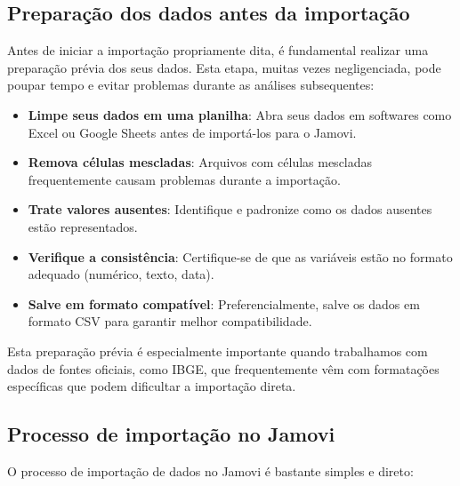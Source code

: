 \subsection{Preparação dos dados antes da importação}

Antes de iniciar a importação propriamente dita, é fundamental realizar uma preparação prévia dos seus dados. Esta etapa, muitas vezes negligenciada, pode poupar tempo e evitar problemas durante as análises subsequentes:

\begin{itemize}
    \item \textbf{Limpe seus dados em uma planilha}: Abra seus dados em softwares como Excel ou Google Sheets antes de importá-los para o Jamovi.
    \item \textbf{Remova células mescladas}: Arquivos com células mescladas frequentemente causam problemas durante a importação.
    \item \textbf{Trate valores ausentes}: Identifique e padronize como os dados ausentes estão representados.
    \item \textbf{Verifique a consistência}: Certifique-se de que as variáveis estão no formato adequado (numérico, texto, data).
    \item \textbf{Salve em formato compatível}: Preferencialmente, salve os dados em formato CSV para garantir melhor compatibilidade.
\end{itemize}

Esta preparação prévia é especialmente importante quando trabalhamos com dados de fontes oficiais, como IBGE, que frequentemente vêm com formatações específicas que podem dificultar a importação direta.

\subsection{Processo de importação no Jamovi}

O processo de importação de dados no Jamovi é bastante simples e direto:

